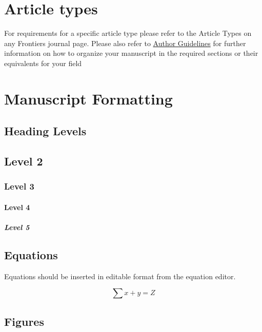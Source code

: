 \documentclass[utf8]{frontiersSCNS}
\begin{document}


\section{Article types}

For requirements for a specific article type please refer to the
Article Types on any Frontiers journal page. Please also refer to
\href{http://home.frontiersin.org/about/author-guidelines#Sections}{Author
  Guidelines} for further information on how to organize your
manuscript in the required sections or their equivalents for your
field


\section{Manuscript Formatting}

\subsection{Heading Levels}


\subsection{Level 2}
\subsubsection{Level 3}
\paragraph{Level 4}
\subparagraph{Level 5}

\subsection{Equations}
Equations should be inserted in editable format from the equation editor.

\begin{equation}
\sum x+ y =Z\label{eq:01}
\end{equation}

\subsection{Figures}
\end{document}
